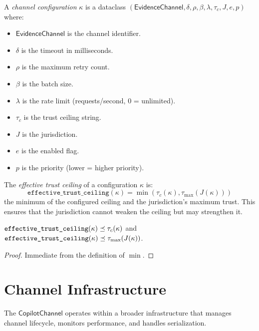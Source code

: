 \documentclass[11pt]{article}
\newcommand{\CopChan}{\mathsf{CopilotChannel}}
\newcommand{\EvChan}{\mathsf{EvidenceChannel}}
\newcommand{\EffCeil}{\texttt{effective\_trust\_ceiling}}
\begin{document}
\begin{definition}
\label{def:config}
A \emph{channel configuration} $\kappa$ is a dataclass
$(\EvChan, \delta, \rho, \beta, \lambda, \tau_c, J, e, p)$ where:
\begin{itemize}[leftmargin=2em]
\item $\EvChan$ is the channel identifier.
\item $\delta$ is the timeout in milliseconds.
\item $\rho$ is the maximum retry count.
\item $\beta$ is the batch size.
\item $\lambda$ is the rate limit (requests/second, 0 = unlimited).
\item $\tau_c$ is the trust ceiling string.
\item $J$ is the jurisdiction.
\item $e$ is the enabled flag.
\item $p$ is the priority (lower = higher priority).
\end{itemize}
\end{definition}

\begin{definition}
\label{def:eff-ceil}
The \emph{effective trust ceiling} of a configuration $\kappa$ is:
\[
  \EffCeil(\kappa) = \min(\tau_c(\kappa), \tau_{\max}(J(\kappa)))
\]
\ie the minimum of the configured ceiling and the jurisdiction's
maximum trust.  This ensures that the jurisdiction cannot weaken
the ceiling but may strengthen it.
\end{definition}

\begin{lemma}
\label{lem:eff-ceil-conservative}
$\EffCeil(\kappa) \tleq \tau_c(\kappa)$ and
$\EffCeil(\kappa) \tleq \tau_{\max}(J(\kappa))$.
\end{lemma}

\begin{proof}
Immediate from the definition of $\min$.
\end{proof}

\section{Channel Infrastructure}
\label{sec:infra}

The $\CopChan$ operates within a broader infrastructure that
manages channel lifecycle, monitors performance, and handles
serialization.
\end{document}
